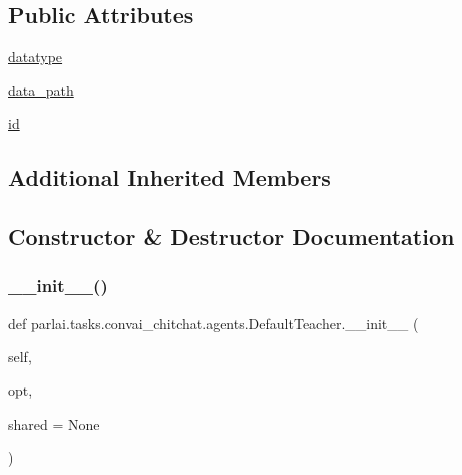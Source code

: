 \subsection*{Public Attributes}
\begin{DoxyCompactItemize}
\item 
\hyperlink{classparlai_1_1tasks_1_1convai__chitchat_1_1agents_1_1DefaultTeacher_a9f90247eb9b5fead9e02ef7e50cc8f37}{datatype}
\item 
\hyperlink{classparlai_1_1tasks_1_1convai__chitchat_1_1agents_1_1DefaultTeacher_a2a216c4d5a2499f39da072f8e8afc44d}{data\+\_\+path}
\item 
\hyperlink{classparlai_1_1tasks_1_1convai__chitchat_1_1agents_1_1DefaultTeacher_acb9a1323c173edc4c95653fcb013fd8e}{id}
\end{DoxyCompactItemize}
\subsection*{Additional Inherited Members}


\subsection{Constructor \& Destructor Documentation}
\mbox{\label{classparlai_1_1tasks_1_1convai__chitchat_1_1agents_1_1DefaultTeacher_a67bf5351429e9cb7b94534211a2a6978}} 
\subsubsection{\texorpdfstring{\+\_\+\+\_\+init\+\_\+\+\_\+()}{\_\_init\_\_()}}
{\footnotesize\ttfamily def parlai.\+tasks.\+convai\+\_\+chitchat.\+agents.\+Default\+Teacher.\+\_\+\+\_\+init\+\_\+\+\_\+ (\begin{DoxyParamCaption}\item[{}]{self,  }\item[{}]{opt,  }\item[{}]{shared = {\ttfamily None} }\end{DoxyParamCaption})}



